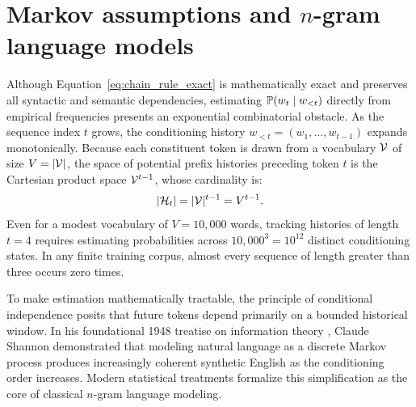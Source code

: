 \documentclass[../../main.tex]{subfiles}
\begin{document}
\clearpage
\section{Markov assumptions and $n$-gram language models}
\label{sec:markov_ngram}

Although Equation~\eqref{eq:chain_rule_exact} is mathematically exact and preserves all syntactic and semantic dependencies, estimating $\mathbb{P}(w_t \mid w_{<t})$ directly from empirical frequencies presents an exponential combinatorial obstacle. As the sequence index $t$ grows, the conditioning history $w_{<t} = (w_1, \dots, w_{t-1})$ expands monotonically. Because each constituent token is drawn from a vocabulary $\mathcal{V}$ of size $V = |\mathcal{V}|$, the space of potential prefix histories preceding token $t$ is the Cartesian product space $\mathcal{V}^{t-1}$, whose cardinality is:
\begin{equation}
\label{eq:state_space_unconstrained}
|\mathcal{H}_t| = |\mathcal{V}|^{t-1} = V^{t-1}.
\end{equation}
Even for a modest vocabulary of $V = 10{,}000$ words, tracking histories of length $t = 4$ requires estimating probabilities across $10{,}000^3 = 10^{12}$ distinct conditioning states. In any finite training corpus, almost every sequence of length greater than three occurs zero times.

To make estimation mathematically tractable, the principle of conditional independence posits that future tokens depend primarily on a bounded historical window. In his foundational 1948 treatise on information theory \cite{shannon1948}, Claude Shannon demonstrated that modeling natural language as a discrete Markov process produces increasingly coherent synthetic English as the conditioning order increases. Modern statistical treatments \cite{jurafsky2024} formalize this simplification as the core of classical $n$-gram language modeling.
\end{document}
